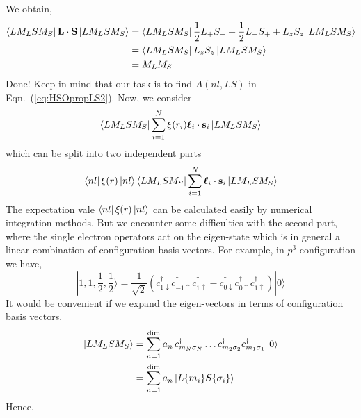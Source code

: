 We obtain,
\begin{align} \label{eq:ArightExp}
\Bra{LM_LSM_S}\vec{L}\cdot\vec{S}\Ket{LM_LSM_S} &
= \Bra{LM_LSM_S} \frac{1}{2}L_+S_- + \frac{1}{2}L_-S_+ + L_zS_z \Ket{LM_LSM_S} \nonumber \\
& = \Bra{LM_LSM_S} L_zS_z \Ket{LM_LSM_S} \nonumber \\
& = M_LM_S
\end{align}
%
Done! Keep in mind that our task is to find $A(nl,LS)$ in Eqn.~(\ref{eq:HSOpropLS2}).
Now, we consider
\begin{equation*}
\Bra{LM_LSM_S} \sum_{i=1}^N \xi(r_i) \boldsymbol{\ell}_i\cdot\vec{s}_i \Ket{LM_LSM_S}
\end{equation*}
which can be split into two independent parts
\begin{equation*}
\Bra{nl}\xi(r)\Ket{nl} \Bra{LM_LSM_S} \sum_{i=1}^N \boldsymbol{\ell}_i\cdot\vec{s}_i \Ket{LM_LSM_S}
\end{equation*}
The expectation vale $\Bra{nl}\xi(r)\Ket{nl}$ can be calculated easily by
numerical integration methods. But we encounter some difficulties with the second part,
where the single electron operators act on the eigen-state
which is in general a linear combination of configuration basis vectors.
For example, in $p^3$ configuration
we have,
\begin{equation}
|1,1,\frac{1}{2},\frac{1}{2}\rangle = \frac{1}{\sqrt{2}} \left( c_{1\downarrow}^\dagger c_{-1\uparrow}^\dagger c_{1\uparrow}^\dagger -c_{0\downarrow}^\dagger c_{0\uparrow}^\dagger c_{1\uparrow}^\dagger \right)|0\rangle
\end{equation}
%
It would be convenient if we expand the eigen-vectors in terms of configuration
basis vectors.
\begin{align}
\Ket{LM_LSM_S} & = \sum_{n=1}^\text{dim} a_n\, c_{m_N\sigma_N}^\dagger \ldots c_{m_2\sigma_2}^\dagger c_{m_1\sigma_1}^\dagger \Ket{0} \nonumber \\
& = \sum_{n=1}^\text{dim} a_n \Ket{L\{m_i\}S\{\sigma_i\}}
\end{align}
%
Hence,
\vspace{-0.1em}
